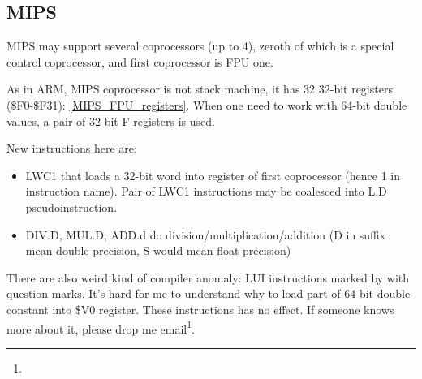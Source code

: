 \ifx\RUSSIAN\undefined
\subsection{MIPS}

MIPS may support several coprocessors (up to 4), 
zeroth of which is a special control coprocessor,
and first coprocessor is FPU one.

As in ARM, MIPS coprocessor is not stack machine, it has 32 32-bit registers (\$F0-\$F31): 
\ref{MIPS_FPU_registers}.
When one need to work with 64-bit double values, a pair of 32-bit F-registers is used.



New instructions here are:

\begin{itemize}

\item LWC1 that loads a 32-bit word into register of first coprocessor (hence 1 in instruction name).
Pair of LWC1 instructions may be coalesced into L.D pseudoinstruction.

\item DIV.D, MUL.D, ADD.d do division/multiplication/addition 
(D in suffix mean double precision, S would mean float precision)

\end{itemize}

\index{\CompilerAnomaly}
There are also weird kind of compiler anomaly: LUI instructions marked by with question marks.
It's hard for me to understand why to load part of 64-bit double constant into \$V0 register.
These instructions has no effect.
If someone knows more about it, please drop me email\footnote{\EMAIL}.

\fi
